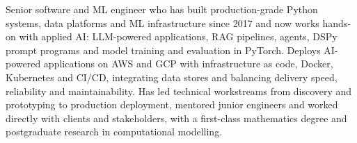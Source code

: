 
\begin{cvparagraph}

Senior software and ML engineer who has built production-grade Python systems, data platforms and ML infrastructure since 2017 and now works hands-on with applied AI: LLM-powered applications, RAG pipelines, agents, DSPy prompt programs and model training and evaluation in PyTorch. Deploys AI-powered applications on AWS and GCP with infrastructure as code, Docker, Kubernetes and CI/CD, integrating data stores and balancing delivery speed, reliability and maintainability. Has led technical workstreams from discovery and prototyping to production deployment, mentored junior engineers and worked directly with clients and stakeholders, with a first-class mathematics degree and postgraduate research in computational modelling.

\end{cvparagraph}
